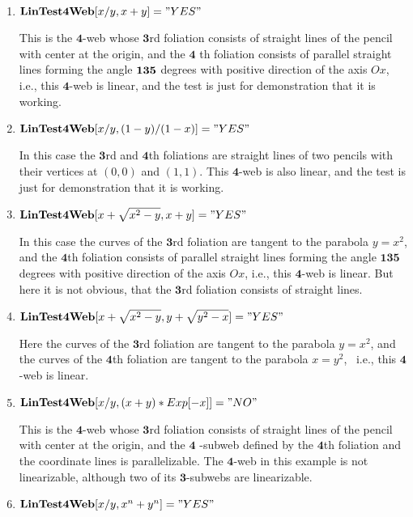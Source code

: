 \documentclass{article}
\begin{document}
\begin{enumerate}
\item $\mathbf{LinTest4Web}[x/y,x+y]="YES"$

This is the $\mathbf{4}$-web whose $\mathbf{3}$rd foliation consists of
straight lines of the pencil with center at the origin, and the $\mathbf{4}$%
th foliation consists of parallel straight lines forming the angle $\mathbf{%
135}$ degrees with positive direction of the axis $Ox$, i.e., this $\mathbf{4%
}$-web is linear, and the test is just for demonstration that it is working.

\item $\mathbf{LinTest4Web}[x/y,(1-y)/(1-x)]="YES"$

In this case the $\mathbf{3}$rd and $\mathbf{4}$th foliations are straight
lines of two pencils with their vertices at $(0,0)$ and $(1,1)$. This $%
\mathbf{4}$-web is also linear, and the test is just for demonstration that
it is working.

\item $\mathbf{LinTest4Web}[x+\sqrt{x^{2}-y},x+y]="YES"$

In this case the curves of the $\mathbf{3}$rd foliation are tangent to the
parabola $y=x^{2}$, and the $\mathbf{4}$th foliation consists of parallel
straight lines forming the angle $\mathbf{135}$ degrees with positive
direction of the axis $Ox$, i.e., this $\mathbf{4}$-web is linear. But here
it is not obvious, that the $\mathbf{3}$rd foliation consists of straight
lines.

\item $\mathbf{LinTest4Web}[x+\sqrt{x^{2}-y},y+\sqrt{y^{2}-x}]="YES"$

Here the curves of the $\mathbf{3}$rd foliation are tangent to the parabola $%
y=x^{2}$, and the curves of the $\mathbf{4}$th foliation are tangent to the
parabola $x=y^{2}$, \ i.e., this $\mathbf{4}$-web is linear.

\item $\mathbf{LinTest4Web}[x/y,(x+y)\ast Exp[-x]]="NO"$

This is the $\mathbf{4}$-web whose $\mathbf{3}$rd foliation consists of
straight lines of the pencil with center at the origin, and the $\mathbf{4}$%
-subweb defined by the $\mathbf{4}$th foliation and the coordinate lines is
parallelizable. The $\mathbf{4}$-web in this example is not linearizable,
although two of its $\mathbf{3}$-subwebs are linearizable.

\item $\mathbf{LinTest4Web}[x/y,x^{n}+y^{n}]="YES"$


\end{enumerate}
\end{document}
